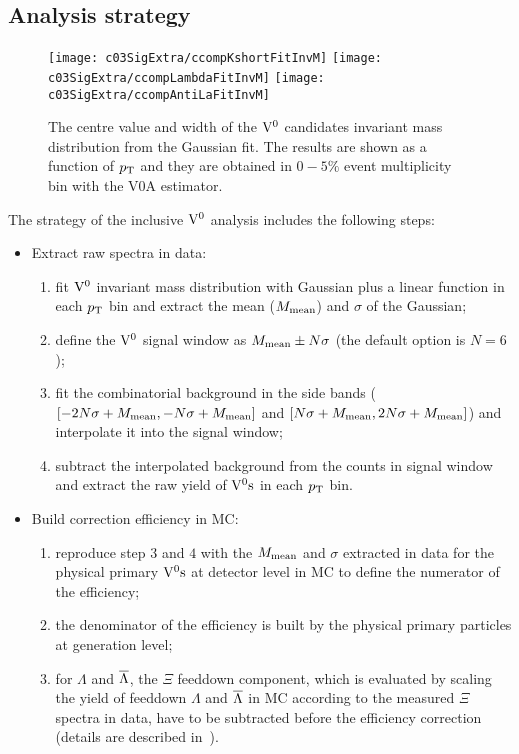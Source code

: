 \subsection{Analysis strategy}\label{sec:c03AnaStrategy}

\begin{figure}[htb]
\begin{center}
\texttt{[image: c03SigExtra/ccompKshortFitInvM]}
\texttt{[image: c03SigExtra/ccompLambdaFitInvM]}
\texttt{[image: c03SigExtra/ccompAntiLaFitInvM]}
\caption{The centre value and width of the ${\rm V}^{0}$ candidates invariant mass
         distribution from the Gaussian fit.
         The results are shown as a function of $p_{\rm T}$ and they are obtained
         in $0-5\%$ event multiplicity bin with the V0A estimator.}
\label{fig:c03FitInvM}
\end{center}
\end{figure}

The strategy of the inclusive ${\rm V}^{0}$ analysis includes the following steps:
\begin{itemize}
\item Extract raw spectra in data:
      \begin{enumerate}
      \item fit ${\rm V}^{0}$ invariant mass distribution with Gaussian plus a
            linear function in each $p_{\rm T}$ bin and extract the
            mean ($M_{\rm mean}$) and $\sigma$ of the Gaussian;
      \item define the ${\rm V}^{0}$ signal window as
            $M_{\rm mean}\pm N\sigma$ (the default option is $N=6$);
      \item fit the combinatorial background in the side
            bands ($[-2N\sigma+M_{\rm mean},-N\sigma+M_{\rm mean}]$
            and $[N\sigma+M_{\rm mean},2N\sigma+M_{\rm mean}]$)
            and interpolate it into the signal window;
      \item subtract the interpolated background from the counts in
            signal window and extract the raw yield of ${\rm V}^{0}{\rm s}$ in
            each $p_{\rm T}$ bin.
      \end{enumerate}
\item Build correction efficiency in MC:
      \begin{enumerate}
      \item reproduce step $3$ and $4$ with the $M_{\rm mean}$ and $\sigma$
            extracted in data for the physical primary ${\rm V}^{0}{\rm s}$ at detector
            level in MC to define the numerator of the efficiency;
      \item the denominator of the efficiency is built by the physical primary
            particles at generation level;
      \item for $\Lambda$ and $\overline{\Lambda}$, the $\Xi$ feeddown component,
            which is evaluated by scaling the yield of feeddown $\Lambda$
            and $\overline{\Lambda}$ in MC according to the measured $\Xi$ spectra in data,
            have to be subtracted before the efficiency correction (details
            are described in~\cite{Ali2012:ana501}).
      \end{enumerate}
\end{itemize}

